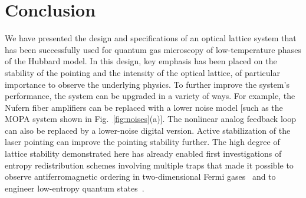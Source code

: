 \documentclass[twocolumn,aip,rsi,reprint,bibnotes]{revtex4-1}
\begin{document}
\section{Conclusion}
We have presented the design and specifications of an optical lattice system that has been successfully used for quantum gas microscopy of low-temperature phases of the Hubbard model.
In this design, key emphasis has been placed on the stability of the pointing and the intensity of the optical lattice, of particular importance to observe the underlying physics.
To further improve the system's performance, the system can be upgraded in a variety of ways. For example, the Nufern fiber amplifiers can be replaced with a lower noise model [such as the MOPA system shown in Fig.~\ref{fig:noises}(a)]. The nonlinear analog feedback loop can also be replaced by a lower-noise digital version.
Active stabilization of the laser pointing can improve the pointing stability further.
The high degree of lattice stability demonstrated here has already enabled first investigations of entropy redistribution schemes involving multiple traps that made it possible to observe antiferromagnetic ordering in two-dimensional Fermi gases~\cite{Mazurenko2017} and to engineer low-entropy quantum states~\cite{Chiu2018}.


\end{document}
